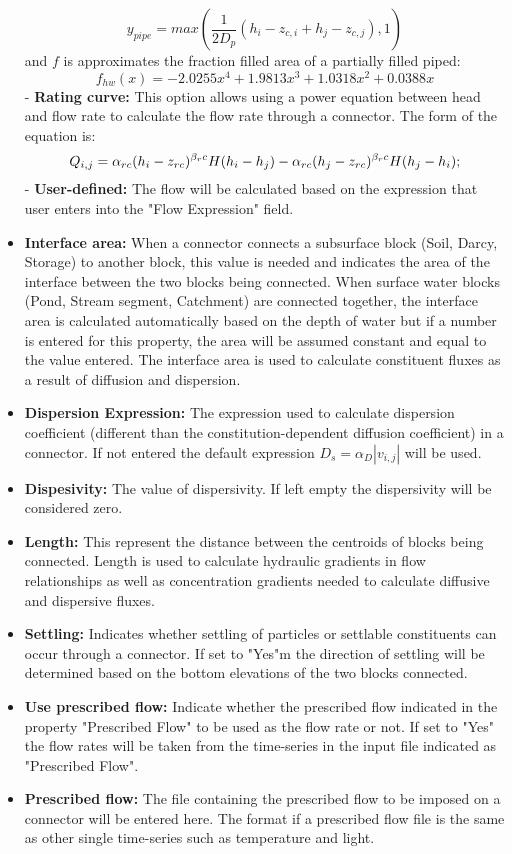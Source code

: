 \begin{itemize}
    \begin{equation}
    \label{eq:10}
    y_{pipe}=max(\frac{1}{2 D_p}(h_i-z_{c,i}+h_j-z_{c,j}),1) 
    \end{equation}
    and $f$ is approximates the fraction filled area of a partially filled piped:
    \begin{equation}
    \label{eq:11}
    f_{hw}(x)=-2.0255 x^4 + 1.9813 x^3 +1.0318 x^2 + 0.0388 x 
    \end{equation}
 - \textbf{Rating curve: } This option allows using a power equation between head and flow rate to calculate the flow rate through a connector. The form of the equation is: 
    \begin{equation}
    \label{eq:12}
    Q_{i,j}=\alpha_{rc}(h_i-z_{rc})^{\beta_rc}H(h_i-h_j) - \\ \alpha_{rc}(h_j-z_{rc})^{\beta_rc}H(h_j-h_i);
    \end{equation}
- \textbf{User-defined: } The flow will be calculated based on the expression that user enters into the "Flow Expression" field.
\item \textbf{Interface area: } When a connector connects a subsurface block (Soil, Darcy, Storage) to another block, this value is needed and indicates the area of the interface between the two blocks being connected. When surface water blocks (Pond, Stream segment, Catchment) are connected together, the interface area is calculated automatically based on the depth of water but if a number is entered for this property, the area will be assumed constant and equal to the value entered. The interface area is used to calculate constituent fluxes as a result of diffusion and dispersion.   
\item \textbf{Dispersion Expression: } The expression used to calculate dispersion coefficient (different than the constitution-dependent diffusion coefficient) in a connector. If not entered the default expression $D_s = \alpha_D |v_{i,j}|$ will be used. 
\item \textbf{Dispesivity: } The value of dispersivity. If left empty the dispersivity will be considered zero. 
\item \textbf{Length: } This represent the distance between the centroids of blocks being connected. Length is used to calculate hydraulic gradients in flow relationships as well as concentration gradients needed to calculate diffusive and dispersive fluxes. 
\item \textbf{Settling: } Indicates whether settling of particles or settlable constituents can occur through a connector. If set to "Yes"m the direction of settling will be determined based on the bottom elevations of the two blocks connected. 
\item \textbf{Use prescribed flow: } Indicate whether the prescribed flow indicated in the property "Prescribed Flow" to be used as the flow rate or not. If set to "Yes" the flow rates will be taken from the time-series in the input file indicated as "Prescribed Flow". 
\item \textbf{Prescribed flow: } The file containing the prescribed flow to be imposed on a connector will be entered here. The format if a prescribed flow file is the same as other single time-series such as temperature and light.
\end{itemize}
